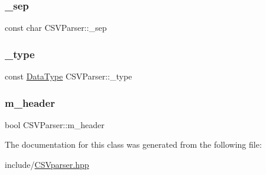 \mbox{\label{class_c_s_v_parser_a9d778da8bd668d2393d4402ce7eae9cd}} 
\subsubsection{\texorpdfstring{\_sep}{\_sep}}
{\footnotesize\ttfamily const char C\+S\+V\+Parser\+::\+\_\+sep\hspace{0.3cm}{\ttfamily [private]}}

\mbox{\label{class_c_s_v_parser_a27cff8e618160b2685f1e05b8a7da9cf}} 
\subsubsection{\texorpdfstring{\_type}{\_type}}
{\footnotesize\ttfamily const \mbox{\hyperlink{_c_s_vparser_8hpp_ad8ed01ff3ff33333d8e19db4d2818bb6}{Data\+Type}} C\+S\+V\+Parser\+::\+\_\+type\hspace{0.3cm}{\ttfamily [private]}}

\mbox{\label{class_c_s_v_parser_a4dcb7bb113b65d0abf816dd899395545}} 
\subsubsection{\texorpdfstring{m\_header}{m\_header}}
{\footnotesize\ttfamily bool C\+S\+V\+Parser\+::m\+\_\+header\hspace{0.3cm}{\ttfamily [private]}}



The documentation for this class was generated from the following file\+:\begin{DoxyCompactItemize}
\item 
include/\mbox{\hyperlink{_c_s_vparser_8hpp}{C\+S\+Vparser.\+hpp}}\end{DoxyCompactItemize}
